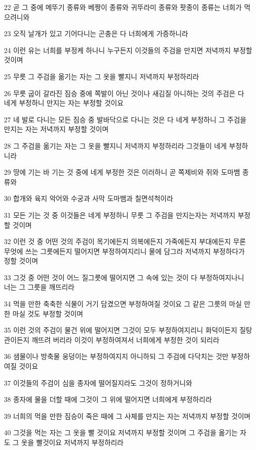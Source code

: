 \par 22 곧 그 중에 메뚜기 종류와 베짱이 종류와 귀뚜라미 종류와 팟종이 종류는 너희가 먹으려니와
\par 23 오직 날개가 있고 기어다니는 곤충은 다 너희에게 가증하니라
\par 24 이런 유는 너희를 부정케 하나니 누구든지 이것들의 주검을 만지면 저녁까지 부정할 것이며
\par 25 무릇 그 주검을 옮기는 자는 그 옷을 빨지니 저녁까지 부정하리라
\par 26 무릇 굽이 갈라진 짐승 중에 쪽발이 아닌 것이나 새김질 아니하는 것의 주검은 다 네게 부정하니 만지는 자는 부정할 것이요
\par 27 네 발로 다니는 모든 짐승 중 발바닥으로 다니는 것은 다 네게 부정하니 그 주검을 만지는 자는 저녁까지 부정할 것이며
\par 28 그 주검을 옮기는 자는 그 옷을 빨지니 저녁까지 부정하리라 그것들이 네게 부정하니라
\par 29 땅에 기는 바 기는 것 중에 네게 부정한 것은 이러하니 곧 쪽제비와 쥐와 도마뱀 종류와
\par 30 합개와 육지 악어와 수궁과 사막 도마뱀과 칠면석척이라
\par 31 모든 기는 것 중 이것들은 네게 부정하니 무릇 그 주검을 만지는자는 저녁까지 부정할 것이며
\par 32 이런 것 중 어떤 것의 주검이 목기에든지 의복에든지 가죽에든지 부대에든지 무론 무엇에 쓰는 그릇에든지 떨어지면 부정하여지리니 물에 담그라 저녁까지 부정하다가 정할 것이며
\par 33 그것 중 어떤 것이 어느 질그릇에 떨어지면 그 속에 있는 것이 다 부정하여지나니 너는 그 그릇을 깨뜨리라
\par 34 먹을 만한 축축한 식물이 거기 담겼으면 부정하여질 것이요 그 같은 그릇의 마실 만한 마실 것도 부정할 것이며
\par 35 이런 것의 주검이 물건 위에 떨어지면 그것이 모두 부정하여지리니 화덕이든지 질탕관이든지 깨뜨려 버리라 이것이 부정하여져서 너희에게 부정한 것이 되리라
\par 36 샘물이나 방축물 웅덩이는 부정하여지지 아니하되 그 주검에 다닥치는 것만 부정하여질 것이요
\par 37 이것들의 주검이 심을 종자에 떨어질지라도 그것이 정하거니와
\par 38 종자에 물을 더할 때에 그것이 그 위에 떨어지면 너희에게 부정하리라
\par 39 너희의 먹을 만한 짐승이 죽은 때에 그 사체를 만지는 자는 저녁까지 부정할 것이며
\par 40 그것을 먹는 자는 그 옷을 빨 것이요 저녁까지 부정할 것이며 그 주검을 옮기는 자도 그 옷을 빨것이요 저녁까지 부정하리라
